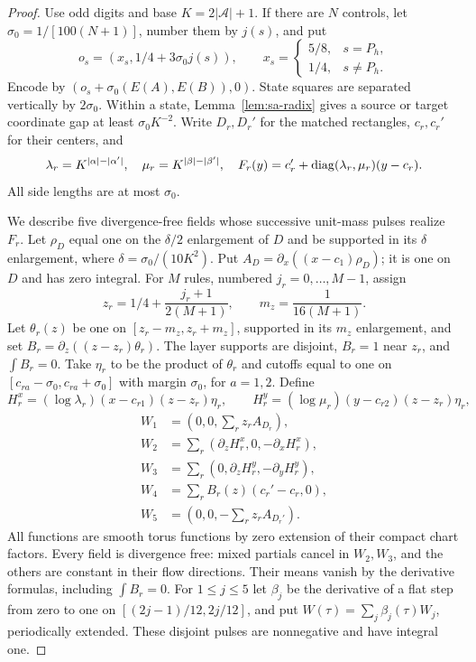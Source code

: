 \begin{proof}
Use odd digits and base $K=2|\mathcal A|+1$.  If there are $N$ controls,
let $\sigma_0=1/[100(N+1)]$, number them by $j(s)$, and put
\[
 o_s=(x_s,1/4+3\sigma_0j(s)),\qquad
 x_s=\begin{cases}5/8,&s=P_h,\\1/4,&s\ne P_h.\end{cases}
\]
Encode by $(o_s+\sigma_0(E(A),E(B)),0)$.
State squares are separated vertically by $2\sigma_0$.  Within a state,
Lemma~\ref{lem:sa-radix} gives a source or target coordinate gap at least
$\sigma_0K^{-2}$.  Write $D_r,D_r'$ for the matched rectangles,
$c_r,c_r'$ for their centers, and
\[
 \lambda_r=K^{|\alpha|-|\alpha'|},\quad
 \mu_r=K^{|\beta|-|\beta'|},\quad
 F_r(y)=c_r'+\operatorname{diag}(\lambda_r,\mu_r)(y-c_r).
\]
All side lengths are at most $\sigma_0$.

We describe five divergence-free fields whose successive unit-mass pulses
realize $F_r$.  Let $\rho_D$ equal one on the $\delta/2$ enlargement of
$D$ and be supported in its $\delta$ enlargement, where
$\delta=\sigma_0/(10K^2)$.  Put
$A_D=\partial_x((x-c_1)\rho_D)$; it is one on $D$ and has zero integral.
For $M$ rules, numbered $j_r=0,\ldots,M-1$, assign
\[
 z_r=1/4+\frac{j_r+1}{2(M+1)},\qquad m_z=\frac1{16(M+1)}.
\]
Let $\theta_r(z)$ be one on $[z_r-m_z,z_r+m_z]$, supported in its
$m_z$ enlargement, and set $B_r=\partial_z((z-z_r)\theta_r)$.
The layer supports are disjoint, $B_r=1$ near $z_r$, and $\int B_r=0$.
Take $\eta_r$ to be the product of $\theta_r$ and cutoffs equal to one
on $[c_{ra}-\sigma_0,c_{ra}+\sigma_0]$ with margin $\sigma_0$,
for $a=1,2$.  Define
\[
 H_r^x=(\log\lambda_r)(x-c_{r1})(z-z_r)\eta_r,
 \qquad H_r^y=(\log\mu_r)(y-c_{r2})(z-z_r)\eta_r,
\]
\[
\begin{aligned}
 W_1&=(0,0,\sum_r z_rA_{D_r}),\\
 W_2&=\sum_r(\partial_zH_r^x,0,-\partial_xH_r^x),\\
 W_3&=\sum_r(0,\partial_zH_r^y,-\partial_yH_r^y),\\
 W_4&=\sum_r B_r(z)(c_r'-c_r,0),\\
 W_5&=(0,0,-\sum_r z_rA_{D_r'}).
\end{aligned}
\]
All functions are smooth torus functions by zero extension of their
compact chart factors.  Every field is divergence free: mixed partials
cancel in $W_2,W_3$, and the others are constant in their flow directions.
Their means vanish by the derivative formulas, including $\int B_r=0$.
For $1\le j\le5$ let $\beta_j$ be the derivative of a flat step from
zero to one on $[(2j-1)/12,2j/12]$, and put
$W(\tau)=\sum_j\beta_j(\tau)W_j$, periodically extended.
These disjoint pulses are nonnegative and have integral one.


\end{proof}
